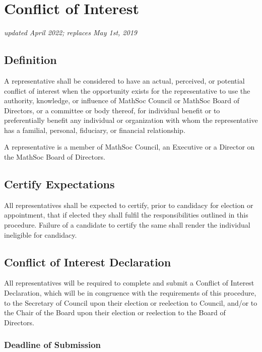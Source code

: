 \section{Conflict of Interest}
\emph{updated April 2022; replaces May 1st, 2019}

\subsection{Definition}


A representative shall be considered to have an actual, perceived, or potential conflict of interest when the opportunity exists for the representative to use the authority, knowledge, or influence of MathSoc Council or MathSoc Board of Directors, or a committee or body thereof, for individual benefit or to preferentially benefit any individual or organization with whom the representative has a familial, personal, fiduciary, or financial relationship.  

\noindent

A representative is a member of MathSoc Council, an Executive or a Director on the MathSoc Board of Directors. 

\subsection{Certify Expectations}

All representatives shall be expected to certify, prior to candidacy for election or appointment, that if elected they shall fulfil the responsibilities outlined in this procedure. Failure of a candidate to certify the same shall render the individual ineligible for candidacy.

\subsection{Conflict of Interest Declaration}

All representatives will be required to complete and submit a Conflict of Interest Declaration, which will be in congruence with the requirements of this procedure, to the Secretary of Council upon their election or reelection to Council, and/or to the Chair of the Board upon their election or reelection to the Board of Directors. 

\subsubsection{Deadline of Submission}

